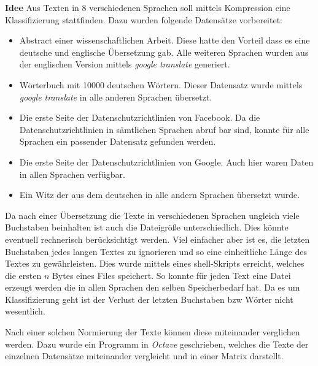 \documentclass[12pt,german]{article}
\begin{document}
\textbf{Idee}
Aus Texten in 8 verschiedenen Sprachen soll mittels Kompression eine Klassifizierung stattfinden. Dazu wurden folgende Datensätze vorbereitet:

\begin{itemize}
	\item Abstract einer wissenschaftlichen Arbeit. Diese hatte den Vorteil dass es eine deutsche und englische Übersetzung gab. Alle weiteren Sprachen wurden aus der englischen Version mittels \textit{google translate} generiert.
	\item Wörterbuch mit 10000 deutschen Wörtern. Dieser Datensatz wurde mittels \textit{google translate} in alle anderen Sprachen übersetzt.
	\item Die erste Seite der Datenschutzrichtlinien von Facebook. Da die Datenschutzrichtlinien in sämtlichen Sprachen abruf bar sind, konnte für alle Sprachen ein passender Datensatz gefunden werden.
	\item Die erste Seite der Datenschutzrichtlinien von Google. Auch hier waren Daten in allen Sprachen verfügbar.
	\item Ein Witz der aus dem deutschen in alle andern Sprachen übersetzt wurde.
\end{itemize}

Da nach einer Übersetzung die Texte in verschiedenen Sprachen ungleich viele Buchstaben beinhalten ist auch die Dateigröße unterschiedlich. Dies könnte eventuell rechnerisch berücksichtigt werden. Viel einfacher aber ist es, die letzten Buchstaben jedes langen Textes zu ignorieren und so eine einheitliche Länge des Textes zu gewährleisten. Dies wurde mittels eines shell-Skripts erreicht, welches die ersten $n$ Bytes eines Files speichert. So konnte für jeden Text eine Datei erzeugt werden die in allen Sprachen den selben Speicherbedarf hat. Da es um Klassifizierung geht ist der Verlust der letzten Buchstaben bzw Wörter nicht wesentlich. 



Nach einer solchen Normierung der Texte können diese miteinander verglichen werden. Dazu wurde ein Programm in \textit{Octave} geschrieben, welches die Texte der einzelnen Datensätze miteinander vergleicht und in einer Matrix darstellt. 
\end{document}
